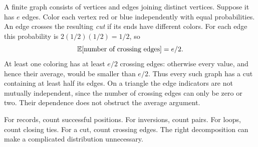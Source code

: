 A finite graph consists of vertices and edges joining distinct vertices.
Suppose it has $e$ edges. Color each vertex red or blue independently
with equal probabilities. An edge crosses the resulting \emph{cut} if
its ends have different colors. For each edge this probability is
$2(1/2)(1/2)=1/2$, so
\[
\mathbb E[\text{number of crossing edges}]=e/2.
\]
At least one coloring has at least $e/2$ crossing edges: otherwise every
value, and hence their average, would be smaller than $e/2$.
Thus every such graph has a cut containing at least half its edges.
On a triangle the edge indicators are not mutually independent, since
the number of crossing edges can only be zero or two. Their dependence
does not obstruct the average argument.

\begin{bigidea}[title={Choose what contributes one}]
For records, count successful positions. For inversions, count pairs.
For loops, count closing ties. For a cut, count crossing edges.
The right decomposition can make a complicated distribution unnecessary.
\end{bigidea}
